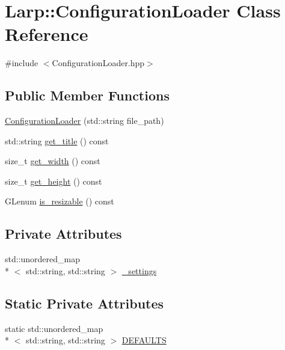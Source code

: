 \hypertarget{classLarp_1_1ConfigurationLoader}{\section{Larp\-:\-:Configuration\-Loader Class Reference}
\label{classLarp_1_1ConfigurationLoader}
}


{\ttfamily \#include $<$Configuration\-Loader.\-hpp$>$}

\subsection*{Public Member Functions}
\begin{DoxyCompactItemize}
\item 
\hyperlink{classLarp_1_1ConfigurationLoader_a56c72334b1d45ba36ec438d249ae7324}{Configuration\-Loader} (std\-::string file\-\_\-path)
\item 
std\-::string \hyperlink{classLarp_1_1ConfigurationLoader_a183f5d7ea7af3138ac6858de71333632}{get\-\_\-title} () const 
\item 
size\-\_\-t \hyperlink{classLarp_1_1ConfigurationLoader_abc3b910d211aabeb36972f864534f182}{get\-\_\-width} () const 
\item 
size\-\_\-t \hyperlink{classLarp_1_1ConfigurationLoader_a780a48cf2f6d3396ea846fc1a2995b9d}{get\-\_\-height} () const 
\item 
G\-Lenum \hyperlink{classLarp_1_1ConfigurationLoader_a164ed479f1a77417c799f62a92204690}{is\-\_\-resizable} () const 
\end{DoxyCompactItemize}
\subsection*{Private Attributes}
\begin{DoxyCompactItemize}
\item 
std\-::unordered\-\_\-map\\*
$<$ std\-::string, std\-::string $>$ \hyperlink{classLarp_1_1ConfigurationLoader_ab952b0b19ffa465a73fd58302fccb124}{\-\_\-settings}
\end{DoxyCompactItemize}
\subsection*{Static Private Attributes}
\begin{DoxyCompactItemize}
\item 
static std\-::unordered\-\_\-map\\*
$<$ std\-::string, std\-::string $>$ \hyperlink{classLarp_1_1ConfigurationLoader_a5b5d1d47f1f5cced025a85d248ae57e7}{D\-E\-F\-A\-U\-L\-T\-S}
\end{DoxyCompactItemize}


